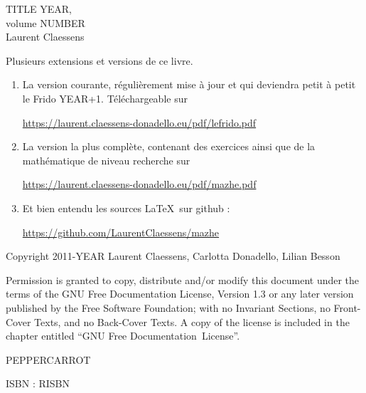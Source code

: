 \documentclass[a4paper,twoside,11pt]{book}
\begin{document}
\pagestyle{empty}

\phantom{Foo}
\newpage

\phantom{Foo}
\newpage

\begin{center}
    TITLE YEAR, \\
    volume NUMBER \\
    Laurent Claessens
\end{center}

\newpage

Plusieurs extensions et versions de ce livre.
\begin{enumerate}
    \item
        La version courante, régulièrement mise à jour et qui deviendra petit à petit le Frido YEAR+1. Téléchargeable sur
        \begin{center}
            \url{https://laurent.claessens-donadello.eu/pdf/lefrido.pdf}
        \end{center}
    \item
        La version la plus complète, contenant des exercices ainsi que de la mathématique de niveau recherche sur
        \begin{center}
            \url{https://laurent.claessens-donadello.eu/pdf/mazhe.pdf}
        \end{center}
    \item
        Et bien entendu les sources \LaTeX\ sur github :
        \begin{center}
            \url{https://github.com/LaurentClaessens/mazhe}
        \end{center}
\end{enumerate}

\newpage

\phantom{un foobar bleuté}

\vfill

\begin{center}
Copyright 2011-YEAR  Laurent Claessens, Carlotta Donadello, Lilian Besson

Permission is granted to copy, distribute and/or modify this document under the terms of the GNU Free Documentation License, Version 1.3 or any later version published by the Free Software Foundation; with no Invariant Sections, no Front-Cover Texts, and no Back-Cover Texts. A copy of the license is included in the chapter entitled ``GNU Free Documentation~License''.
\end{center}

\begin{center}
    PEPPERCARROT
\end{center}

    \begin{center}
ISBN : RISBN
    \end{center}
\end{document}
